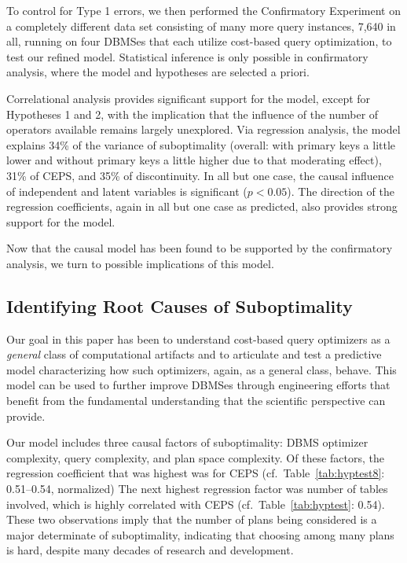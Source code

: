 \documentclass[prodmode,acmtods]{acmsmall}
\begin{document}
To control for Type 1 errors, we then performed the Confirmatory 
Experiment on a completely different data set consisting of many more 
query instances, 7,640 in all, running on four \hbox{DBMSes} that each
utilize cost-based query optimization, to test
our refined model. Statistical inference is only possible in confirmatory
analysis, where the model and hypotheses are selected a priori.

Correlational analysis provides significant support for the model, except
for Hypotheses 1 and 2, with the implication that the influence of the
number of operators available remains largely unexplored. Via regression
analysis, the model explains 34\% of the variance of suboptimality (overall:
with primary keys a little lower and without primary keys a little higher
due to that moderating effect), 31\% of CEPS, and 35\% of discontinuity. In
all but one case, the causal influence of independent and latent variables is significant
($p<0.05$). The direction of the regression coefficients, again in all but one
case as predicted, also provides strong support for the model.

Now that the causal model has been found to be supported by the confirmatory
analysis, we turn to possible implications of this model.

\subsection{Identifying Root Causes of Suboptimality}\label{sec:root}

Our goal in this paper has been to understand cost-based query optimizers
as a {\em general} class of computational artifacts and to articulate and test
a predictive model characterizing how such optimizers,
again, as a general class, behave.  This model can be used to further
improve \hbox{DBMSes} through engineering \hbox{efforts} that benefit from the fundamental
understanding that the scientific perspective can provide.

Our model includes three causal factors of suboptimality: \hbox{DBMS} optimizer
complexity, query complexity, and plan space complexity. Of these factors,
the regression \hbox{coefficient} that was highest was for CEPS
(cf.~Table~\ref{tab:hyptest8}: 0.51--0.54, normalized) The next \hbox{highest}
regression factor was number of tables involved, which is highly correlated
with CEPS (cf.~Table~\ref{tab:hyptest}: 0.54). These two observations imply that the
number of plans being considered is a major determinate of
suboptimality, indicating that choosing among many plans is hard, despite
many decades of research and development.
\end{document}
